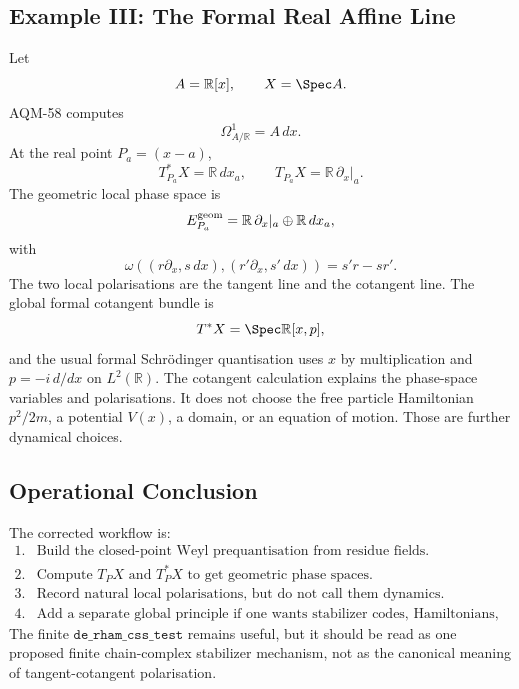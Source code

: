\subsection{Example III: The Formal Real Affine Line}

Let
\[
  A=\mathbb R[x],\qquad X=\Spec A.
\]
AQM-58 computes
\[
  \Omega^1_{A/\mathbb R}=A\,dx.
\]
At the real point \(P_a=(x-a)\),
\[
  T_{P_a}^*X=\mathbb R\,dx_a,\qquad T_{P_a}X=\mathbb R\,\partial_x|_a .
\]
The geometric local phase space is
\[
  E_{P_a}^{\rm geom}=
  \mathbb R\,\partial_x|_a\oplus \mathbb R\,dx_a,
\]
with
\[
  \omega((r\partial_x,s\,dx),(r'\partial_x,s'\,dx))=s'r-sr'.
\]
The two local polarisations are the tangent line and the cotangent line.  The
global formal cotangent bundle is
\[
  T^*X=\Spec\mathbb R[x,p],
\]
and the usual formal Schr\"odinger quantisation uses \(x\) by multiplication
and \(p=-i\,d/dx\) on \(L^2(\mathbb R)\).  The cotangent calculation explains
the phase-space variables and polarisations.  It does not choose the free
particle Hamiltonian \(p^2/2m\), a potential \(V(x)\), a domain, or an equation
of motion.  Those are further dynamical choices.

\subsection{Operational Conclusion}

The corrected workflow is:
\[
\begin{array}{ll}
1. & \text{Build the closed-point Weyl prequantisation from residue fields.}\\
2. & \text{Compute }T_PX\text{ and }T_P^*X\text{ to get geometric phase spaces.}\\
3. & \text{Record natural local polarisations, but do not call them dynamics.}\\
4. & \text{Add a separate global principle if one wants stabilizer codes,
     Hamiltonians, or propagation.}
\end{array}
\]
The finite \(\texttt{de\_rham\_css\_test}\) remains useful, but it should be
read as one proposed finite chain-complex stabilizer mechanism, not as the
canonical meaning of tangent-cotangent polarisation.

